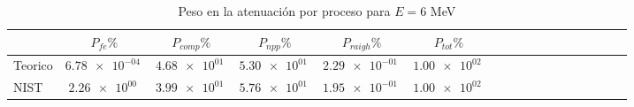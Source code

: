 \begin{table}
\caption{Peso en la atenuación por proceso para $E=6$ MeV}
\begin{tabular}{lcccccccccccccccc}
\toprule
 & $P_{fe} \%$ & $P_{comp} \%$  & $P_{npp} \%$  & $P_{raigh} \%$ & $P_{tot} \%$ \\
\midrule
Teorico & $\SI{6.78e-04}{}$ & $\SI{4.68e+01}{}$ & $\SI{5.30e+01}{}$ & $\SI{2.29e-01}{}$ & $\SI{1.00e+02}{}$ \\
NIST & $\SI{2.26e+00}{}$ & $\SI{3.99e+01}{}$ & $\SI{5.76e+01}{}$ & $\SI{1.95e-01}{}$ & $\SI{1.00e+02}{}$ \\
\bottomrule
\end{tabular}
\end{table}
